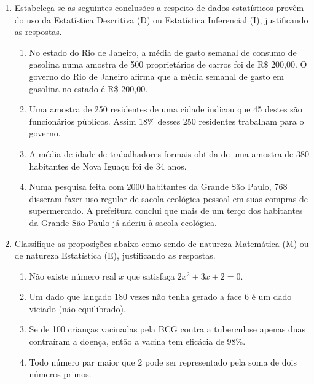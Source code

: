 \exercise
\label{\detokenize{PE103-E:exercicios}}\label{\detokenize{PE103-E::doc}}
\begin{enumerate}
\item Estabeleça se as seguintes conclusões a respeito de dados estatísticos provêm do uso da Estatística Descritiva (D) ou Estatística Inferencial (I), justificando as respostas.
\begin{enumerate}
\item {} 
No estado do Rio de Janeiro, a média de gasto semanal de consumo de gasolina numa amostra de 500 proprietários de carros foi de R\$ 200,00. O governo do Rio de Janeiro afirma que a média semanal de gasto em gasolina no estado é R\$ 200,00.

\item {} 
Uma amostra de 250 residentes de uma cidade indicou que 45 destes são funcionários públicos. Assim 18\% desses 250 residentes trabalham para o governo.

\item {} 
A média de idade de trabalhadores formais obtida de uma amostra de 380 habitantes de Nova Iguaçu foi de 34 anos.

\item {} 
Numa pesquisa feita com 2000 habitantes da Grande São Paulo, 768 disseram fazer uso regular de sacola ecológica pessoal em suas compras de supermercado.  A prefeitura conclui que mais de um terço dos habitantes da Grande São Paulo já aderiu à sacola ecológica.

\end{enumerate}

\item Classifique as proposições abaixo como sendo de natureza Matemática (M) ou de natureza Estatística (E), justificando as respostas.
\begin{enumerate}
\item {} 
Não existe número real \(x\) que satisfaça \(2x^2 + 3x + 2 = 0\).

\item {} 
Um dado que lançado 180 vezes não tenha gerado a face 6 é um dado viciado (não equilibrado).

\item {} 
Se de 100 crianças vacinadas pela BCG contra a tuberculose apenas duas contraíram a doença, então a vacina tem eficácia de 98\%.

\item {} 
Todo número par maior que 2 pode ser representado pela soma de dois números primos.


\end{enumerate}
\end{enumerate}
